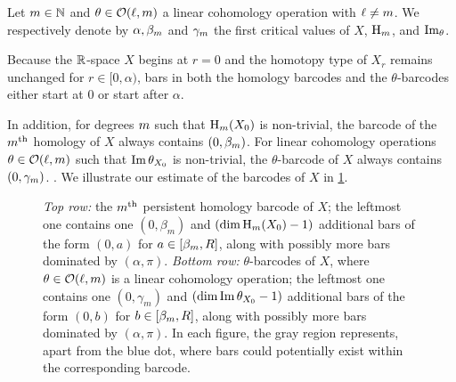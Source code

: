 \subsubsection{}\label{subsub:barcode_general}

Let \(m \in \mathbb{N}\) and \(\theta \in \mathcal{O}(\ell,m)\) a linear cohomology operation with \(\ell \neq m\).
We respectively denote by $\alpha, \beta_m$ and $\gamma_m$ the first critical values of $X$, \(\mathrm{H}_m\), and \(\operatorname{Im}_\theta\).

Because the $\mathbb{R}$-space $X$ begins at $r=0$ and the homotopy type of $X_r$ remains unchanged for $r\in [0,\alpha)$, bars in both the homology barcodes and the $\theta$-barcodes either start at $0$ or start after $\alpha$.

In addition, for degrees $m$ such that $\mathrm{H}_m(X_0)$ is non-trivial, the barcode of the $m^{\mathrm{th}}$ homology of $X$ always contains $(0,\beta_m )$.
For linear cohomology operations $\theta \in \mathcal{O}(\ell, m)$ such that $\operatorname{Im} \theta_{X_0}$ is non-trivial, the $\theta$-barcode of $X$ always contains $(0,\gamma_m)$.
.
We illustrate our estimate of the barcodes of $X$ in \cref{fig:barcodes_general}.

\begin{figure}
	\centering
	
	\caption{
        \emph{Top row:} the $m^{\mathrm{th}}$ persistent homology barcode of $X$; the leftmost one contains one $(0,\beta_m)$ and \((\dim \operatorname{H}_m(X_0) - 1)\) additional bars of the form \((0, a)\) for \(a \in [\beta_m, R]\), along with possibly more bars dominated by \((\alpha, \pi)\).
		\emph{Bottom row:} $\theta$-barcodes of $X$, where $\theta\in\mathcal{O}(\ell,m)$ is a linear cohomology operation; the leftmost one contains one \((0, \gamma_m)\) and \((\dim \operatorname{Im} \theta_{X_0} - 1)\) additional bars of the form \((0, b)\) for \(b \in [\beta_m, R]\), along with possibly more bars dominated by \((\alpha, \pi)\).
        In each figure, the gray region represents, apart from the blue dot, where bars could potentially exist within the corresponding barcode.
  }
	\label{fig:barcodes_general}
\end{figure}

